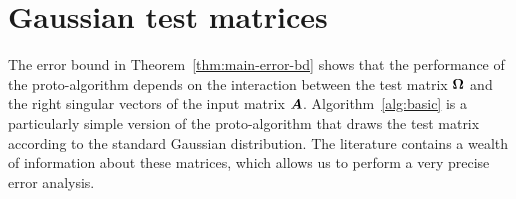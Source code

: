 \documentclass[final]{siamltex}
\newcounter{algorithm}[section]
\begin{document}

%

\section{Gaussian test matrices}
\label{sec:gaussians}

The error bound in Theorem~\ref{thm:main-error-bd} shows that the
performance of the proto-algorithm depends on the interaction
between the test matrix $\bm{\Omega}$ and the right singular
vectors of the input matrix $\bm{A}$.  Algorithm~\ref{alg:basic}
is a particularly simple version of the proto-algorithm that
draws the test matrix according to the standard
Gaussian distribution.  The literature contains a wealth of
information about these matrices, which allows us to perform
a very precise error analysis.



\end{document}
